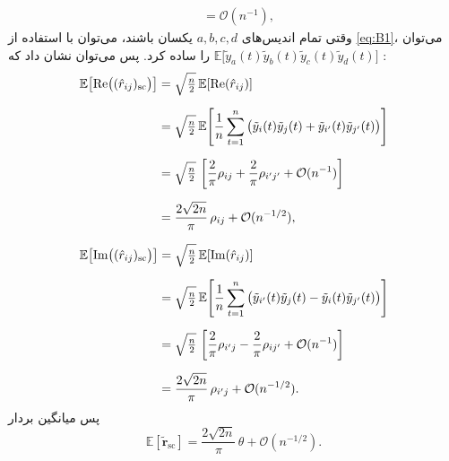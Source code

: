 \begin{اثبات}
\begin{align}
		&= \mathcal{O}(n^{-1}),
	\end{align}
	وقتی تمام اندیس‌های
	${a,b,c,d}$
	یکسان باشند، می‌توان با استفاده از \eqref{eq:B1}، می‌توان 
	$\mathbb{E}\!\big[\tilde y_a(t)\tilde y_b(t)\tilde y_c(t)\tilde y_d(t)\big]$
	را ساده کرد. پس می‌توان نشان داد که :
	\begin{align}
		\mathbb{E}\!\left[\mathrm{Re}\big((\hat r_{ij})_{\mathrm{sc}}\big)\right]
		&= \sqrt{\tfrac{n}{2}}\,
		\mathbb{E}\!\left[\mathrm{Re}(\hat r_{ij})\right] \notag \\[6pt]
		&= \sqrt{\tfrac{n}{2}}\,
		\mathbb{E}\!\left[\frac{1}{n}\sum_{t=1}^{n}\big(\tilde y_{i}(t)\tilde y_{j}(t)
		+ \tilde y_{i'}(t)\tilde y_{j'}(t)\big)\right] \notag \\[6pt]
		&= \sqrt{\tfrac{n}{2}}\,
		\left[\frac{2}{\pi}\rho_{ij} + \frac{2}{\pi}\rho_{i'j'} + \mathcal{O}(n^{-1})\right] \notag \\[6pt]
		&= \frac{2\sqrt{2n}}{\pi}\,\rho_{ij} + \mathcal{O}(n^{-1/2}),
	\end{align}
	
	\begin{align}
		\mathbb{E}\!\left[\mathrm{Im}\big((\hat r_{ij})_{\mathrm{sc}}\big)\right]
		&= \sqrt{\tfrac{n}{2}}\,
		\mathbb{E}\!\left[\mathrm{Im}(\hat r_{ij})\right] \notag \\[6pt]
		&= \sqrt{\tfrac{n}{2}}\,
		\mathbb{E}\!\left[\frac{1}{n}\sum_{t=1}^{n}\big(\tilde y_{i'}(t)\tilde y_{j}(t)
		- \tilde y_{i}(t)\tilde y_{j'}(t)\big)\right] \notag \\[6pt]
		&= \sqrt{\tfrac{n}{2}}\,
		\left[\frac{2}{\pi}\rho_{i'j} - \frac{2}{\pi}\rho_{ij'} + \mathcal{O}(n^{-1})\right] \notag \\[6pt]
		&= \frac{2\sqrt{2n}}{\pi}\,\rho_{i'j} + \mathcal{O}(n^{-1/2}).
	\end{align}
	پس میانگین بردار
	\begin{equation}
		\mathbb{E}\!\left[\tilde{\mathbf{r}}_{\mathrm{sc}}\right]
		= \frac{2\sqrt{2n}}{\pi}\,\theta+\mathcal{O}(n^{-1/2}).
	\end{equation}
	

\end{اثبات}
